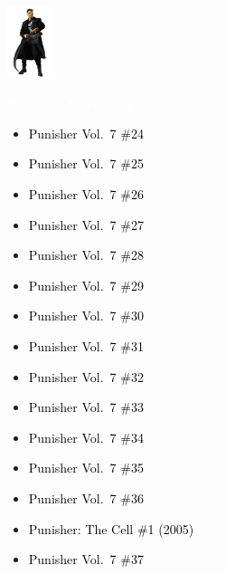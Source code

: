 \documentclass[12pt]{article}
\newcommand{\checkbox}{\raisebox{0.0ex}{\fbox{\rule{0ex}{1.5ex} \rule{1.5ex}{0ex}}}}
\begin{document}
\begin{center}
    \vspace*{2cm}
    \includegraphics[width=0.1\textwidth]{PUNISHER1.PNG}
    \vspace{0.3cm}

    {\Huge \textbf{\textcolor{white}{Punisher Chronological Checklist}}}
\end{center}

\vspace{0.3cm}
\noindent
\begin{tcolorbox}[
  colback=white!95!gray,
  colframe=black,
  width=\textwidth,
  arc=4mm,
  auto outer arc,
  boxrule=0.8pt,
  left=8pt,right=8pt,top=8pt,bottom=8pt
]
\begin{itemize}[left=0pt,label={\checkbox}]
    \item \textcolor{black}{Punisher Vol.\ 7 \#24}
    \item \textcolor{black}{Punisher Vol.\ 7 \#25}
    \item \textcolor{black}{Punisher Vol.\ 7 \#26}
    \item \textcolor{black}{Punisher Vol.\ 7 \#27}
    \item \textcolor{black}{Punisher Vol.\ 7 \#28}
    \item \textcolor{black}{Punisher Vol.\ 7 \#29}
    \item \textcolor{black}{Punisher Vol.\ 7 \#30}
    \item \textcolor{black}{Punisher Vol.\ 7 \#31}
    \item \textcolor{black}{Punisher Vol.\ 7 \#32}
    \item \textcolor{black}{Punisher Vol.\ 7 \#33}
    \item \textcolor{black}{Punisher Vol.\ 7 \#34}
    \item \textcolor{black}{Punisher Vol.\ 7 \#35}
    \item \textcolor{black}{Punisher Vol.\ 7 \#36}
    \item \textcolor{black}{Punisher: The Cell \#1 (2005)}
    \item \textcolor{black}{Punisher Vol.\ 7 \#37}
\end{itemize}
\end{tcolorbox}
\end{document}
